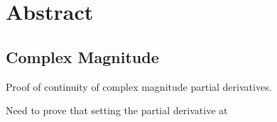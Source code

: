 \chapter{Abstract}

\section{Complex Magnitude}
Proof of continuity of complex magnitude partial derivatives.

Need to prove that setting the partial derivative at 
